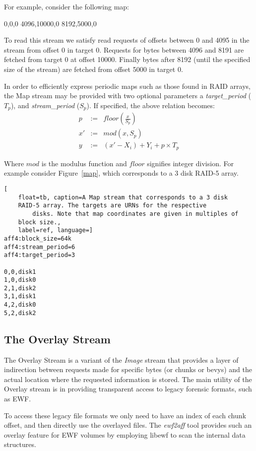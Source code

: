 \documentclass[10pt, conference]{IEEEtran}
\begin{document}
For example, consider the following map:
\begin{verbatim*}
0,0,0
4096,10000,0
8192,5000,0
\end{verbatim*}

To read this stream we satisfy read requests of offsets between 0 and
4095 in the stream from offset 0 in target 0. Requests for bytes
between 4096 and 8191 are fetched from target 0 at offset
10000. Finally bytes after 8192 (until the specified size of the
stream) are fetched from offset 5000 in target 0.

In order to efficiently express periodic maps such as those found in
RAID arrays, the Map stream may be provided with two optional
parameters a {\em target\_period} ($T_p$), and {\em stream\_period}
($S_p$). If specified, the above relation becomes:
\begin{eqnarray*}
p &:=& floor\left (\frac{x}{S_p} \right) \\
x' &:=& mod(x ,S_p)  \\   \label{eq:no1}
y &:=& (x'-X_i) + Y_i + p \times T_p
\end{eqnarray*}

Where $mod$ is the modulus function and $floor$ signifies integer
division. For example consider Figure~\ref{map}, which corresponds to a 3
disk RAID-5 array.

\begin{lstlisting}[
	float=tb, caption=A Map stream that corresponds to a 3 disk
	RAID-5 array. The targets are URNs for the respective
        disks. Note that map coordinates are given in multiples of 
	block size.,
	label=ref, language=]
aff4:block_size=64k 
aff4:stream_period=6 
aff4:target_period=3

0,0,disk1
1,0,disk0
2,1,disk2
3,1,disk1
4,2,disk0
5,2,disk2
\end{lstlisting}

\subsection{The Overlay Stream}
The Overlay Stream is a variant of the {\em Image} stream that
provides a layer of indirection between requests made for specific
bytes (or chunks or bevys) and the actual location where the requested
information is stored. The main utility of the Overlay stream is in
providing transparent access to legacy forensic formats, such as EWF.

To access these legacy file formats we only need to have an index of
each chunk offset, and then directly use the overlayed files.  The {\em
ewf2aff} tool provides such an overlay feature for EWF volumes by
employing libewf to scan the internal data structures.
\end{document}
